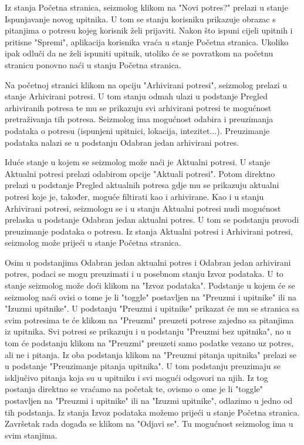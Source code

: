 		Iz stanja Početna stranica, seizmolog klikom na "Novi potres?" prelazi u stanje Ispunjavanje novog upitnika. U tom se stanju korisniku prikazuje obrazac s pitanjima o potresu kojeg korisnik želi prijaviti. 
        Nakon što ispuni cijeli upitnih i pritisne "Spremi", aplikacija korisnika vraća u stanje Početna stranica.
        Ukoliko ipak odluči da ne želi ispuniti upitnik, utoliko će se povratkom na početnu stranicu ponovno naći u stanju Početna stranica. 
        
		Na početnoj stranici klikom na opciju "Arhivirani potresi", seizmolog prelazi u stanje Arhivirani potresi. U tom stanju odmah ulazi u podstanje Pregled arhiviranih potresa te mu se prikazuju svi arhivirani potresi te mogućnost pretraživanja tih potresa.
        Seizmolog ima mogućnost odabira i preuzimanja podataka o potresu (ispunjeni upitnici, lokacija, intezitet...). Preuzimanje podataka nalazi se u podstanju Odabran jedan arhivirani potres.
        
		Iduće stanje u kojem se seizmolog može naći je Aktualni potresi. U stanje Aktualni potresi prelazi odabirom opcije "Aktuali potresi". 
        Potom direktno prelazi u podstanje Pregled aktualnih potresa gdje mu se prikazuju aktualni potresi koje je, također, moguće filtirati kao i arhivirane. Kao i u stanju Arhivirani potresi, seizmologu se i u stanju Aktualni potresi nudi mogućnost 
        prelaska u podstanje Odabran jedan aktualni potres. U tom se podstanju provodi preuzimanje podataka o potresu. Iz stanja Aktualni potresi i Arhivirani potresi, seizmolog može prijeći u stanje Početna stranica.
       
		Osim u podstanjima Odabran jedan aktualni potres i Odabran jedan arhivirani potres, podaci se mogu preuzimati i u posebnom stanju Izvoz podataka. U to stanje seizmolog može doći klikom na "Izvoz podataka". 
        Podstanje u kojem će se seizmolog naći ovisi o tome je li "toggle" postavljen na "Preuzmi i upitnike" ili na "Izuzmi upitnike". U podstanju "Preuzmi i upitnike" prikazat će mu se stranica sa svim potresima te će klikom na "Preuzmi" preuzeti potrese zajedno sa pitanjima iz upitnika.
        Svi potresi se prikazuju i u podstanju "Preuzmi bez upitnika", no u tom će podstanju klikom na "Preuzmi" preuzeti samo podatke vezano uz potres, ali ne i pitanja. Iz oba podstanja klikom na "Preuzmi pitanja upitnika" prelazi se u podstanje "Preuzimanje pitanja upitnika".
        U tom podstanju preuzimaju se isključivo pitanja koja su u upitniku i svi mogući odgovori na njih. Iz tog postanja direktno se vraćamo na početak te, ovismo o ome je li "toggle" postavljen na "Preuzmi i upitnike" ili na "Izuzmi upitnike", odlazimo u jedno od tih podstanja.
        Iz stanja Izvoz podataka možemo prijeći u stanje Početna stranica.
        Završetak rada događa se klikom na "Odjavi se". Tu mogućnost seizmolog ima u svim stanjima.
			
